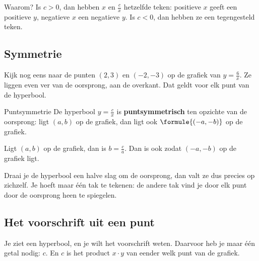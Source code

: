 Waarom? Is $c > 0$, dan hebben $x$ en $\tfrac cx$ hetzelfde teken: positieve $x$ geeft een positieve $y$, negatieve $x$ een negatieve $y$. Is $c < 0$, dan hebben ze een tegengesteld teken.

\subsection{Symmetrie}

Kijk nog eens naar de punten $(2, 3)$ en $(-2, -3)$ op de grafiek van $y = \tfrac6x$. Ze liggen even ver van de oorsprong, aan de overkant. Dat geldt voor elk punt van de hyperbool.

\begin{theorie}
\begin{stelling}{Puntsymmetrie}
De hyperbool $y = \tfrac cx$ is \textbf{\textcolor{accent}{puntsymmetrisch}} ten opzichte van de oorsprong: ligt $(a, b)$ op de grafiek, dan ligt ook $\formule{(-a, -b)}$ op de grafiek.
\end{stelling}
\begin{bewijs}
Ligt $(a, b)$ op de grafiek, dan is $b = \tfrac ca$. Dan is ook
zodat $(-a, -b)$ op de grafiek ligt.
\end{bewijs}
\end{theorie}

Draai je de hyperbool een halve slag om de oorsprong, dan valt ze dus precies op zichzelf. Je hoeft maar één tak te tekenen: de andere tak vind je door elk punt door de oorsprong heen te spiegelen.

\begin{oefeningen}
\end{oefeningen}

\subsection{Het voorschrift uit een punt}

Je ziet een hyperbool, en je wilt het voorschrift weten. Daarvoor heb je maar één getal nodig: $c$. En $c$ is het product $x \cdot y$ van eender welk punt van de grafiek.


